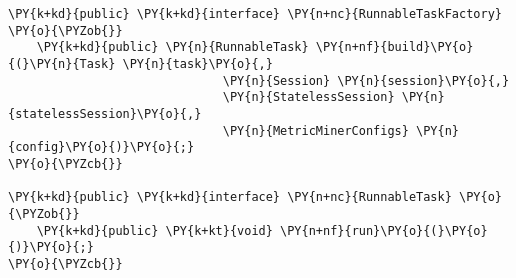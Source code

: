\begin{Verbatim}[commandchars=\\\{\}]
\PY{k+kd}{public} \PY{k+kd}{interface} \PY{n+nc}{RunnableTaskFactory} \PY{o}{\PYZob{}}
    \PY{k+kd}{public} \PY{n}{RunnableTask} \PY{n+nf}{build}\PY{o}{(}\PY{n}{Task} \PY{n}{task}\PY{o}{,} 
                              \PY{n}{Session} \PY{n}{session}\PY{o}{,} 
                              \PY{n}{StatelessSession} \PY{n}{statelessSession}\PY{o}{,} 
                              \PY{n}{MetricMinerConfigs} \PY{n}{config}\PY{o}{)}\PY{o}{;}
\PY{o}{\PYZcb{}}

\PY{k+kd}{public} \PY{k+kd}{interface} \PY{n+nc}{RunnableTask} \PY{o}{\PYZob{}}
    \PY{k+kd}{public} \PY{k+kt}{void} \PY{n+nf}{run}\PY{o}{(}\PY{o}{)}\PY{o}{;}
\PY{o}{\PYZcb{}}
\end{Verbatim}
